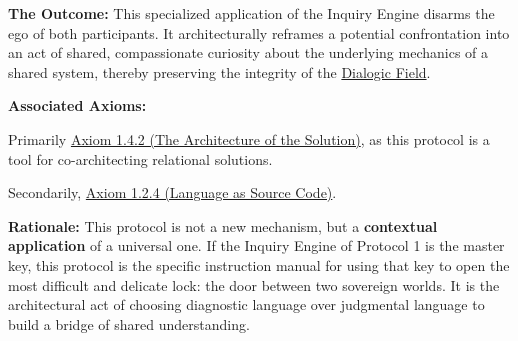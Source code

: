 \documentclass{article}
\begin{document}
\begin{description}
    \item \textbf{The Outcome:} This specialized application of the Inquiry Engine disarms the ego of both participants. It architecturally reframes a potential confrontation into an act of shared, compassionate curiosity about the underlying mechanics of a shared system, thereby preserving the integrity of the \hyperlink{gloss:dialogic_field}{Dialogic Field}.

    \item \textbf{Associated Axioms:} 
        \begin{nobullet}
            \item Primarily \hyperref[axiom_1_4_2_the_architecture_of_the_solution]{Axiom 1.4.2 (The Architecture of the Solution)}, as this protocol is a tool for co-architecting relational solutions.
            \item Secondarily, \hyperref[axiom_1_2_4_language_as_source_code]{Axiom 1.2.4 (Language as Source Code)}.
        \end{nobullet}

    \begin{nobullet}
        \item \textbf{Rationale:} This protocol is not a new mechanism, but a \textbf{contextual application} of a universal one. If the Inquiry Engine of Protocol 1 is the master key, this protocol is the specific instruction manual for using that key to open the most difficult and delicate lock: the door between two sovereign worlds. It is the architectural act of choosing diagnostic language over judgmental language to build a bridge of shared understanding.
    \end{nobullet}
\end{description}
\end{document}
